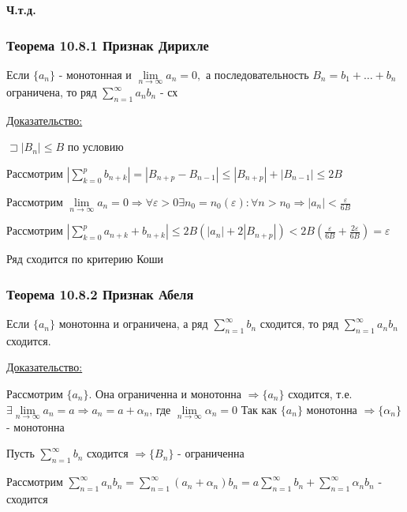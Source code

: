 \documentclass[12pt]{article}
\let\oldsum\sum
\let\oldlim\lim
\renewcommand{\sum}{\oldsum\limits}
\renewcommand{\lim}{\oldlim\limits}
\begin{document}
  \begin{center}
    \textbf{Ч.т.д.}
  \end{center}

  \subsubsection*{Теорема 10.8.1 Признак Дирихле}\label{th:10.8.1}
  \par\noindent
  Если $\{a_n\}$ - монотонная и $\lim_{n \to \infty} a_n = 0,$ а последовательность $B_n=b_1+\dots+b_n$
  ограничена, то ряд $\sum_{n=1}^{\infty} a_nb_n$ - сх

  \underline{Доказательство:}
  \begin{adjustwidth}{1.5em}{1.5em}
    $\sqsupset |B_n| \leq B$ по условию
    
    Рассмотрим $|\sum_{k=0}^{p} b_{n+k}| = |B_{n+p}-B_{n-1}| \leq |B_{n+p}| + |B_{n-1}| \leq 2B$
    
    Рассмотрим $\lim_{n \to \infty} a_n =0 \Rightarrow \forall \varepsilon > 0 \exists n_0=n_0(\varepsilon): \forall n>n_0 \Rightarrow |a_n| < \frac{\varepsilon}{6B}$

    Рассмотрим $|\sum_{k=0}^{p} a_{n+k}+b_{n+k}| \leq 2B(|a_n|+2|B_{n+p}|) < 2B(\frac{\varepsilon}{6B}+\frac{2\varepsilon}{6B})=\varepsilon$

    Ряд сходится по критерию Коши
  \end{adjustwidth}

  \subsubsection*{Теорема 10.8.2 Признак Абеля}\label{th:10.8.2}
  \par\noindent
  Если $\{a_n\}$ монотонна и ограничена, а ряд $\sum_{n=1}^{\infty} b_n$ сходится, то ряд $\sum_{n=1}^{\infty} a_n b_n$ сходится.

  \underline{Доказательство:}
  \begin{adjustwidth}{1.5em}{1.5em}
    Рассмотрим $\{a_n\}$. Она ограниченна и монотонна $\Rightarrow \{a_n\}$ сходится,
    т.е. $\exists \lim_{n \to \infty} a_n = a \Rightarrow a_n = a+\alpha_n$, где $\lim_{n \to \infty} \alpha_n = 0$
    Так как $\{a_n\}$ монотонна $\Rightarrow \{\alpha_n\}$ - монотонна

    Пусть $\sum_{n=1}^{\infty} b_n$ сходится $\Rightarrow \{B_n\}$ - ограниченна
    
    Рассмотрим $\sum_{n=1}^{\infty} a_n b_n = \sum_{n=1}^{\infty} (a_n +\alpha_n)b_n=a \sum_{n=1}^{\infty} b_n + \sum_{n=1}^{\infty}\alpha_n b_n$ - сходится
  \end{adjustwidth}
\end{document}
